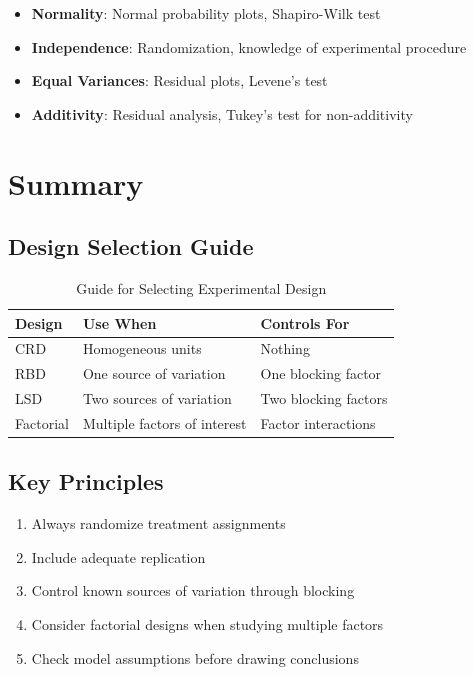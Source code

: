 \documentclass[twoside]{book}
\begin{document}
\begin{itemize}
    \item \textbf{Normality}: Normal probability plots, Shapiro-Wilk test
    \item \textbf{Independence}: Randomization, knowledge of experimental procedure
    \item \textbf{Equal Variances}: Residual plots, Levene's test
    \item \textbf{Additivity}: Residual analysis, Tukey's test for non-additivity
\end{itemize}

\section{Summary}

\subsection{Design Selection Guide}

\begin{table}[h]
\centering
\caption{Guide for Selecting Experimental Design}
\begin{tabular}{|l|l|l|}
\hline
\textbf{Design} & \textbf{Use When} & \textbf{Controls For} \\
\hline
CRD & Homogeneous units & Nothing \\
RBD & One source of variation & One blocking factor \\
LSD & Two sources of variation & Two blocking factors \\
Factorial & Multiple factors of interest & Factor interactions \\
\hline
\end{tabular}
\end{table}

\subsection{Key Principles}

\begin{enumerate}
    \item Always randomize treatment assignments
    \item Include adequate replication
    \item Control known sources of variation through blocking
    \item Consider factorial designs when studying multiple factors
    \item Check model assumptions before drawing conclusions
\end{enumerate}
\end{document}
